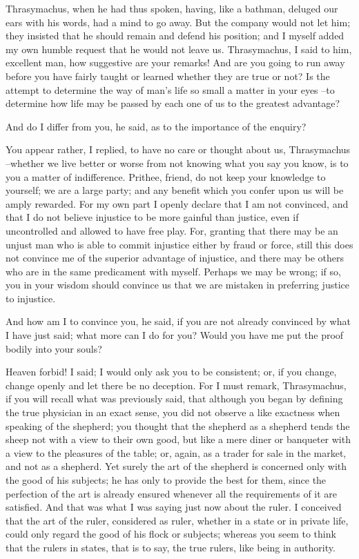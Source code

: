 Thrasymachus, when he had thus spoken, having, like a bathman, deluged our ears with his words, had a mind to go away. But the company would not let him; they insisted that he should remain and defend his position; and I myself added my own humble request that he would not leave us. Thrasymachus, I said to him, excellent man, how suggestive are your remarks! And are you going to run away before you have fairly taught or learned whether they are true or not? Is the attempt to determine the way of man's life so small a matter in your eyes --to determine how life may be passed by each one of us to the greatest advantage?

And do I differ from you, he said, as to the importance of the enquiry?

You appear rather, I replied, to have no care or thought about us, Thrasymachus --whether we live better or worse from not knowing what you say you know, is to you a matter of indifference. Prithee, friend, do not keep your knowledge to yourself; we are a large party; and any benefit which you confer upon us will be amply rewarded. For my own part I openly declare that I am not convinced, and that I do not believe injustice to be more gainful than justice, even if uncontrolled and allowed to have free play. For, granting that there may be an unjust man who is able to commit injustice either by fraud or force, still this does not convince me of the superior advantage of injustice, and there may be others who are in the same predicament with myself. Perhaps we may be wrong; if so, you in your wisdom should convince us that we are mistaken in preferring justice to injustice.

And how am I to convince you, he said, if you are not already convinced by what I have just said; what more can I do for you? Would you have me put the proof bodily into your souls?

Heaven forbid! I said; I would only ask you to be consistent; or, if you change, change openly and let there be no deception. For I must remark, Thrasymachus, if you will recall what was previously said, that although you began by defining the true physician in an exact sense, you did not observe a like exactness when speaking of the shepherd; you thought that the shepherd as a shepherd tends the sheep not with a view to their own good, but like a mere diner or banqueter with a view to the pleasures of the table; or, again, as a trader for sale in the market, and not as a shepherd. Yet surely the art of the shepherd is concerned only with the good of his subjects; he has only to provide the best for them, since the perfection of the art is already ensured whenever all the requirements of it are satisfied. And that was what I was saying just now about the ruler. I conceived that the art of the ruler, considered as ruler, whether in a state or in private life, could only regard the good of his flock or subjects; whereas you seem to think that the rulers in states, that is to say, the true rulers, like being in authority.

